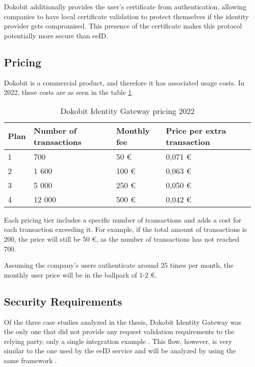 Dokobit additionally provides the user's certificate from authentication, allowing companies to have local certificate validation to protect themselves if the identity provider gets compromised. This presence of the certificate makes this protocol potentially more secure than eeID.

\subsection{Pricing}

Dokobit is a commercial product, and therefore it has associated usage costs. In 2022, these costs are as seen in the table \ref{tab:dokobit-pricing}.

\begin{table}[h]
  \centering
  \caption{Dokobit Identity Gateway pricing 2022}
  \begin{tabular}{| l | l | l | l |}
    \hline
    \bf{Plan} & \bf{Number of transactions} & \bf{Monthly fee} & \bf{Price per extra transaction} \\
    \hline
    1         & 700                         & 50 €             & 0,071 €                          \\
    \hline
    2         & 1 600                       & 100 €            & 0,063 €                          \\
    \hline
    3         & 5 000                       & 250 €            & 0,050 €                          \\
    \hline
    4         & 12 000                      & 500 €            & 0,042 €                          \\
    \hline
  \end{tabular}
  \label{tab:dokobit-pricing}
\end{table}

Each pricing tier includes a specific number of transactions and adds a cost for each transaction exceeding it. For example, if the total amount of transactions is 200, the price will still be 50 €, as the number of transactions has not reached 700.

Assuming the company's users authenticate around 25 times per month, the monthly user price will be in the ballpark of 1-2 €.

\subsection{Security Requirements}

Of the three case studies analyzed in the thesis, Dokobit Identity Gateway was the only one that did not provide any request validation requirements to the relying party, only a single integration example \cite{dokobit-idgw-docs}. This flow, however, is very similar to the one used by the eeID service and will be analyzed by using the same framework \cite{ietf-oauth-security-topics-19}.


